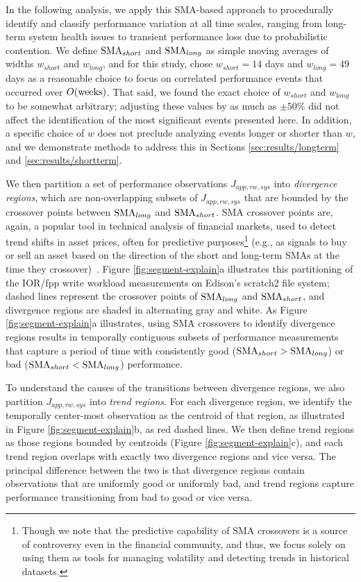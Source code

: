 In the following analysis, we apply this SMA-based approach to procedurally identify and classify performance variation at all time scales, ranging from long-term system health issues to transient performance loss due to probabilistic contention.
We define $\textup{SMA}_{short}$ and $\textup{SMA}_{long}$ as simple moving averages of widths $w_{short}$ and $w_{long}$, and for this study, chose $w_{short} = 14$ days and $w_{long} = 49$ days as a reasonable choice to focus on correlated performance events that occurred over $O(\textup{weeks})$.
That said, we found the exact choice of $w_{short}$ and $w_{long}$ to be somewhat arbitrary; adjusting these values by as much as $\pm 50\%$ did not affect the identification of the most significant events presented here.
In addition, a specific choice of $w$ does not preclude analyzing events longer or shorter than $w$, and we demonstrate methods to address this in Sections \ref{sec:results/longterm} and \ref{sec:results/shortterm}.

We then partition a set of performance observations $J_{app, rw, sys}$ into \emph{divergence regions}, which are non-overlapping subsets of $J_{app, rw, sys}$ that are bounded by the crossover points between $\textup{SMA}_{long}$ and $\textup{SMA}_{short}$.
SMA crossover points are, again, a popular tool in technical analysis of financial markets, used to detect trend shifts in asset prices, often for predictive purposes\footnote{Though we note that the predictive capability of SMA crossovers is a source of controversy even in the financial community, and thus, we focus solely on using them as tools for managing volatility and detecting trends in historical datasets.} (e.g., as signals to buy or sell an asset based on the direction of the short and long-term SMAs at the time they crossover)~\cite{brock1992simple}.
Figure \ref{fig:segment-explain}a illustrates this partitioning of the IOR/fpp write workload measurements on Edison's scratch2 file system;
dashed lines represent the crossover points of $\textup{SMA}_{long}$ and $\textup{SMA}_{short}$, and divergence regions are shaded in alternating gray and white.
As Figure \ref{fig:segment-explain}a illustrates, using SMA crossovers to identify divergence regions results in temporally contiguous subsets of performance measurements that capture a period of time with consistently good (${\textup{SMA}_{short} > \textup{SMA}_{long}}$) or bad (${\textup{SMA}_{short} < \textup{SMA}_{long}}$) performance.

To understand the causes of the transitions between divergence regions, we also partition $J_{app, rw, sys}$ into \emph{trend regions}.
For each divergence region, we identify the temporally center-most observation as the centroid of that region, as illustrated in Figure \ref{fig:segment-explain}b, as red dashed lines.
We then define trend regions as those regions bounded by centroids (Figure \ref{fig:segment-explain}c), and each trend region overlaps with exactly two divergence regions and vice versa.
The principal difference between the two is that divergence regions contain observations that are uniformly good or uniformly bad, and trend regions capture performance transitioning from bad to good or vice versa.

